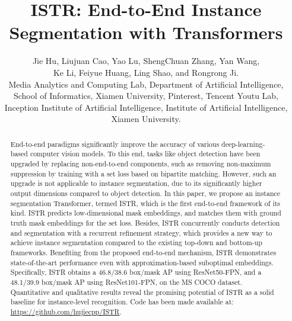 \documentclass[10pt,twocolumn,letterpaper]{article}
\begin{document}
\title{ISTR: End-to-End Instance Segmentation with Transformers}

\author{
Jie Hu, Liujuan Cao, Yao Lu, ShengChuan Zhang, Yan Wang, \\Ke Li, Feiyue Huang, Ling Shao, and Rongrong Ji.\\
Media Analytics and Computing Lab, Department of Artificial Intelligence,\\ School of Informatics, Xiamen University,
Pinterest,
Tencent Youtu Lab, \\
Inception Institute of Artificial Intelligence,
Institute of Artificial Intelligence, Xiamen University.
}

\maketitle
\ificcvfinal\thispagestyle{empty}\fi

\begin{abstract}
End-to-end paradigms significantly improve the accuracy of various deep-learning-based computer vision models.
To this end, tasks like object detection have been upgraded by replacing non-end-to-end components, such as removing non-maximum suppression by training with a set loss based on bipartite matching.
However, such an upgrade is not applicable to instance segmentation, due to its significantly higher output dimensions compared to object detection.
In this paper, we propose an instance segmentation Transformer, termed ISTR, which is the first end-to-end framework of its kind.
ISTR predicts low-dimensional mask embeddings, and matches them with ground truth mask embeddings for the set loss.
Besides, ISTR concurrently conducts detection and segmentation with a recurrent refinement strategy, which provides a new way to achieve instance segmentation compared to the existing top-down and bottom-up frameworks.
Benefiting from the proposed end-to-end mechanism, ISTR demonstrates state-of-the-art performance even with approximation-based suboptimal embeddings.
Specifically, ISTR obtains a 46.8/38.6 box/mask AP using ResNet50-FPN, and a 48.1/39.9 box/mask AP using ResNet101-FPN, on the MS COCO dataset.
Quantitative and qualitative results reveal the promising potential of ISTR as a solid baseline for instance-level recognition.
Code has been made available at: \url{https://github.com/hujiecpp/ISTR}.
\end{abstract}
\end{document}
